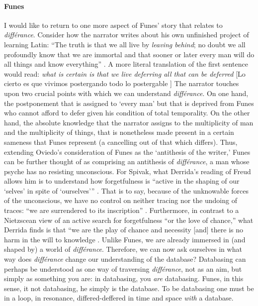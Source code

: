 \paragraph{Funes}
I would like to return to one more aspect of Funes' story that relates to \textit{différance}. Consider how the narrator writes about his own unfinished project of learning Latin: ``The truth is that we all live by \textit{leaving behind}; no doubt we all profoundly know that we are immortal and that sooner or later every man will do all things and know everything'' \im \parencite[113]{Ker94:Fun}. A more literal translation of the first sentence would read: \textit{what is certain is that we live deferring all that can be deferred} [Lo cierto es que vivimos postergando todo lo postergable \parencite{Bor42:Fun}] The narrator touches upon two crucial points with which we can understand \textit{différance}. On one hand, the postponement that is assigned to `every man' but that is deprived from Funes who cannot afford to defer given his condition of total temporality. On the other hand, the absolute knowledge that the narrator assigns to the multiplicity of man and the multiplicity of things, that is nonetheless made present in a certain sameness that Funes represent (a cancelling out of that which differs). Thus, extending Oviedo's consideration of Funes as the `antithesis of the writer,' Funes can be further thought of as comprising an antithesis of \textit{différance}, a man whose psyche has no resisting unconscious. For Spivak, what Derrida's reading of Freud allows him is to understand how forgetfulness is ``active in the shaping of our `selves' in spite of `ourselves''' \parencite[xlv]{Der76:Of}. That is to say, because of the unknowable forces of the unconscious, we have no control on neither tracing nor the undoing of traces: ``we are surrendered to its inscription'' \parencite[xlv]{Der76:Of}. Furthermore, in contrast to a Nietzscean view of an active search for forgetfulness ``or the love of chance,'' what Derrida finds is that ``we are the play of chance and necessity [and] there is no harm in the will to knowledge \parencite[xliv]{Der76:Of}. Unlike Funes, we are already immersed in (and shaped by) a world of \textit{différance}. Therefore, we can now ask ourselves in what way does \textit{différance} change our understanding of the database? Databasing can perhaps be understood as one way of traversing \textit{différance}, not as an aim, but simply as something you are: in databasing, you \textit{are} databasing. Funes, in this sense, it not databasing, he simply is the database. To be databasing one must be in a loop, in resonance, differed-deffered in time and space \textit{with} a database.

